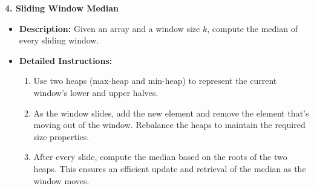 \textbf{4. Sliding Window Median}
\begin{itemize}
    \item \textbf{Description:} Given an array and a window size $k$, compute the median of every sliding window.
    \item \textbf{Detailed Instructions:}
    \begin{enumerate}
        \item Use two heaps (max-heap and min-heap) to represent the current window’s lower and upper halves.
        \item As the window slides, add the new element and remove the element that’s moving out of the window. Rebalance the heaps to maintain the required size properties.
        \item After every slide, compute the median based on the roots of the two heaps. This ensures an efficient update and retrieval of the median as the window moves.
    \end{enumerate}
\end{itemize}